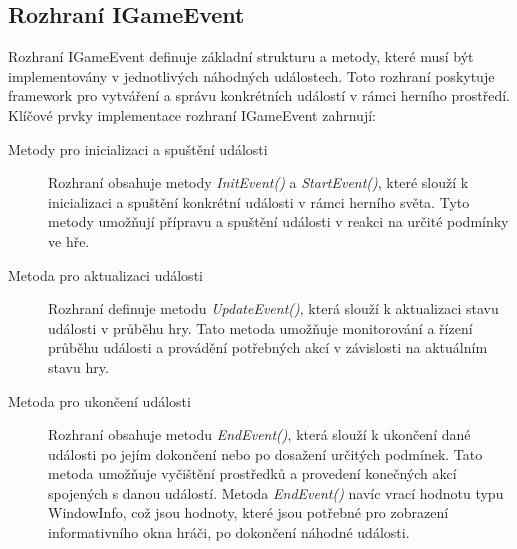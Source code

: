 \subsection{Rozhraní IGameEvent}
Rozhraní IGameEvent definuje základní strukturu a metody, které musí být implementovány v jednotlivých náhodných událostech. Toto rozhraní poskytuje framework pro vytváření a správu konkrétních událostí v rámci herního prostředí. Klíčové prvky implementace rozhraní IGameEvent zahrnují:
\begin{description}
	\item[Metody pro inicializaci a spuštění události] Rozhraní obsahuje metody \textit{InitEvent()} a \textit{StartEvent()}, které slouží k inicializaci a spuštění konkrétní události v rámci herního světa. Tyto metody umožňují přípravu a spuštění události v reakci na určité podmínky ve hře.
	\item[Metoda pro aktualizaci události] Rozhraní definuje metodu \textit{UpdateEvent()}, která slouží k aktualizaci stavu události v průběhu hry. Tato metoda umožňuje monitorování a řízení průběhu události a provádění potřebných akcí v závislosti na aktuálním stavu hry.
	\item[Metoda pro ukončení události] Rozhraní obsahuje metodu \textit{EndEvent()}, která slouží k ukončení dané události po jejím dokončení nebo po dosažení určitých podmínek. Tato metoda umožňuje vyčištění prostředků a provedení konečných akcí spojených s danou událostí. Metoda \textit{EndEvent()} navíc vrací hodnotu typu WindowInfo, což jsou hodnoty, které jsou potřebné pro zobrazení informativního okna hráči, po dokončení náhodné události.
\end{description}

